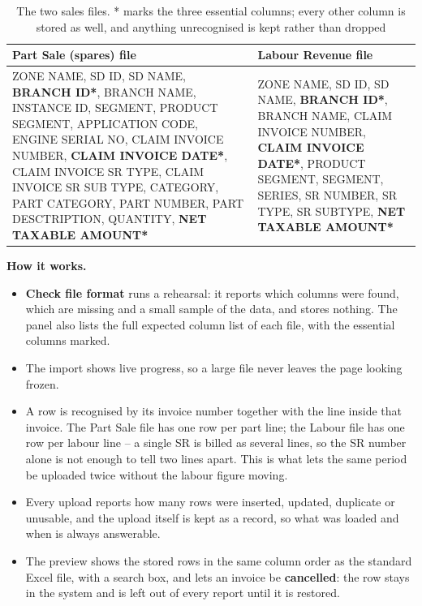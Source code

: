 \documentclass[11pt,a4paper]{article}
\newcommand{\devproc}{\textbf{How it works.}\par}
\begin{document}
\begin{table}[H]\centering\small
\begin{tabularx}{\linewidth}{@{}p{6.5cm}X@{}}
\toprule
\textbf{Part Sale (spares) file} & \textbf{Labour Revenue file} \\
\midrule
ZONE NAME, SD ID, SD NAME, \textbf{BRANCH ID*}, BRANCH NAME, INSTANCE ID, SEGMENT,
PRODUCT SEGMENT, APPLICATION CODE, ENGINE SERIAL NO, CLAIM INVOICE NUMBER,
\textbf{CLAIM INVOICE DATE*}, CLAIM INVOICE SR TYPE, CLAIM INVOICE SR SUB TYPE, CATEGORY,
PART CATEGORY, PART NUMBER, PART DESCTRIPTION, QUANTITY,
\textbf{NET TAXABLE AMOUNT*}
&
ZONE NAME, SD ID, SD NAME, \textbf{BRANCH ID*}, BRANCH NAME, CLAIM INVOICE NUMBER,
\textbf{CLAIM INVOICE DATE*}, PRODUCT SEGMENT, SEGMENT, SERIES, SR NUMBER, SR TYPE,
SR SUBTYPE, \textbf{NET TAXABLE AMOUNT*} \\
\bottomrule
\end{tabularx}
\caption{The two sales files. * marks the three essential columns; every other column is
stored as well, and anything unrecognised is kept rather than dropped}
\end{table}

\devproc
\begin{itemize}
  \item \textbf{Check file format} runs a rehearsal: it reports which columns were found,
  which are missing and a small sample of the data, and stores nothing. The panel also
  lists the full expected column list of each file, with the essential columns marked.
  \item The import shows live progress, so a large file never leaves the page looking
  frozen.
  \item A row is recognised by its invoice number together with the line inside that
  invoice. The Part Sale file has one row per part line; the Labour file has one row per
  labour line -- a single SR is billed as several lines, so the SR number alone is not
  enough to tell two lines apart. This is what lets the same period be uploaded twice
  without the labour figure moving.
  \item Every upload reports how many rows were inserted, updated, duplicate or unusable,
  and the upload itself is kept as a record, so what was loaded and when is always
  answerable.
  \item The preview shows the stored rows in the same column order as the standard Excel
  file, with a search box, and lets an invoice be \textbf{cancelled}: the row stays in
  the system and is left out of every report until it is restored.
\end{itemize}
\end{document}
